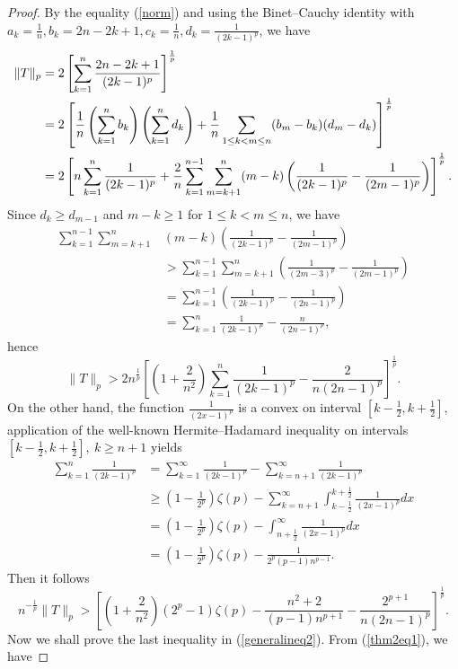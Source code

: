 \documentclass{amsart}
\begin{document}
\begin{proof} By the equality (\ref{norm}) and using the Binet--Cauchy identity with $a_k=\frac{1}{n}, b_k=2n-2k+1, c_k=\frac{1}{n}, d_k=\frac{1}{(2k-1)^p}$, we have
\begin{align}\label{thm2eq1}
\|T\|_p&=2\left[\sum_{k=1}^n\frac{2n-2k+1}{(2k-1)^p}\right]^\frac{1}{p}\notag\\
&=2\left[\frac{1}{n}\left(\sum_{k=1}^nb_k\right)\left(\sum_{k=1}^nd_k\right)+\frac{1}{n}\sum_{1\leq k<m\leq n}(b_m-b_k)(d_m-d_k)\right]^\frac{1}{p}\notag\\
&=2\left[n\sum_{k=1}^n\frac{1}{(2k-1)^p}+\frac{2}{n}\sum_{k=1}^{n-1}\sum_{m=k+1}^{n}(m-k)\left(\frac{1}{(2k-1)^p}-\frac{1}{(2m-1)^p}\right)\right]^\frac{1}{p}.
\end{align}
Since $d_k\geq d_{m-1}$ and $m-k\geq1$ for $1\leq k<m\leq n$, we have
\begin{align*}
    \sum_{k=1}^{n-1}\sum_{m=k+1}^{n}&(m-k)\left(\frac{1}{(2k-1)^p}-\frac{1}{(2m-1)^p}\right)\\
    &> \sum_{k=1}^{n-1}\sum_{m=k+1}^{n}\left(\frac{1}{(2m-3)^p}-\frac{1}{(2m-1)^p}\right)\\
    &= \sum_{k=1}^{n-1}\left(\frac{1}{(2k-1)^p}-\frac{1}{(2n-1)^p}\right)\\
    &= \sum_{k=1}^n\frac{1}{(2k-1)^p}-\frac{n}{(2n-1)^p},
\end{align*}
hence
$$\|T\|_p>2n^\frac{1}{p}\left[\left(1+\frac{2}{n^2}\right)\sum_{k=1}^n\frac{1}{(2k-1)^p}-\frac{2}{n(2n-1)^p}\right]^\frac{1}{p}.$$
On the other hand, the function $\frac{1}{(2x-1)^p}$ is a convex on interval $[k-\frac{1}{2}, k+\frac{1}{2} ]$, application of the well-known Hermite--Hadamard inequality on intervals $[k-\frac{1}{2}, k+\frac{1}{2} ],~k\geq n+1$ yields
\begin{align*}
    \sum_{k=1}^n\frac{1}{(2k-1)^p}&=\sum_{k=1}^\infty\frac{1}{(2k-1)^p}-\sum_{k=n+1}^\infty\frac{1}{(2k-1)^p}\\
    &\geq \left(1-\frac{1}{2^p}\right)\zeta(p)-\sum_{k=n+1}^\infty\int_{k-\frac{1}{2}}^{k+\frac{1}{2}}\frac{1}{(2x-1)^p}dx\\
    &= \left(1-\frac{1}{2^p}\right)\zeta(p)-\int_{n+\frac{1}{2}}^\infty\frac{1}{(2x-1)^p}dx\\
    &=\left(1-\frac{1}{2^p}\right)\zeta(p)-\frac{1}{2^{p}(p-1)n^{p-1}}.
\end{align*}
Then it follows
$$n^{-\frac{1}{p}}\|T\|_p>\left[\left(1+\frac{2}{n^2}\right)(2^p-1)\zeta(p)-\frac{n^2+2}{(p-1)n^{p+1}}-\frac{2^{p+1}}{n(2n-1)^p}\right]^\frac{1}{p}.$$
Now we shall prove the last inequality in (\ref{generalineq2}). From (\ref{thm2eq1}), we have

\end{proof}
\end{document}
